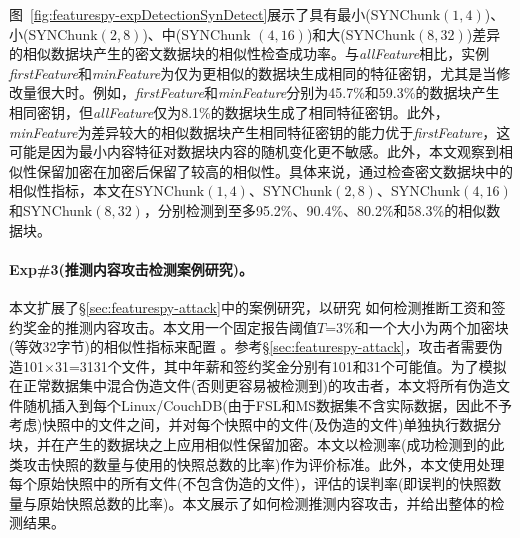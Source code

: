 图~\ref{fig:featurespy-expDetectionSynDetect}展示了具有最小(SYNChunk$(1,4)$)、小(SYNChunk$(2,8)$)、中(SYNChunk $(4,16)$)和大(SYNChunk$(8,32)$)差异的相似数据块产生的密文数据块的相似性检查成功率。与\textit{allFeature}相比，实例\textit{firstFeature}和\textit{minFeature}为仅为更相似的数据块生成相同的特征密钥，尤其是当修改量很大时。例如，\textit{firstFeature}和\textit{minFeature}分别为45.7\%和59.3\%的数据块产生相同密钥，但\textit{allFeature}仅为8.1\%的数据块生成了相同特征密钥。此外，\textit{minFeature}为差异较大的相似数据块产生相同特征密钥的能力优于\textit{firstFeature}，这可能是因为最小内容特征对数据块内容的随机变化更不敏感。此外，本文观察到相似性保留加密在加密后保留了较高的相似性。具体来说，通过检查密文数据块中的相似性指标，本文在SYNChunk$(1,4)$、SYNChunk$(2,8)$、SYNChunk$(4,16)$和SYNChunk$(8,32)$，分别检测到至多95.2\%、90.4\%、80.2\%和58.3\%的相似数据块。

\paragraph*{Exp\#3(推测内容攻击检测案例研究)。}
本文扩展了\S\ref{sec:featurespy-attack}中的案例研究，以研究 \sysnameF 如何检测推断工资和签约奖金的推测内容攻击。本文用一个固定报告阈值$T$=3\%和一个大小为两个加密块(等效32字节)的相似性指标来配置 \sysnameF。参考\S\ref{sec:featurespy-attack}，攻击者需要伪造101$\times$31=3131个文件，其中年薪和签约奖金分别有101和31个可能值。为了模拟在正常数据集中混合伪造文件(否则更容易被检测到)的攻击者，本文将所有伪造文件随机插入到每个Linux/CouchDB(由于FSL和MS数据集不含实际数据，因此不予考虑)快照中的文件之间，并对每个快照中的文件(及伪造的文件)单独执行数据分块\cite{fsl, meyer2011deduplication}，并在产生的数据块之上应用相似性保留加密。本文以检测率(\sysnameF 成功检测到的此类攻击快照的数量与使用的快照总数的比率)作为评价标准。此外，本文使用\sysnameF 处理每个原始快照中的所有文件(不包含伪造的文件)，评估\sysnameF 的误判率(即\sysnameF 误判的快照数量与原始快照总数的比率)。本文展示了\sysnameF 如何检测推测内容攻击，并给出整体的检测结果。

